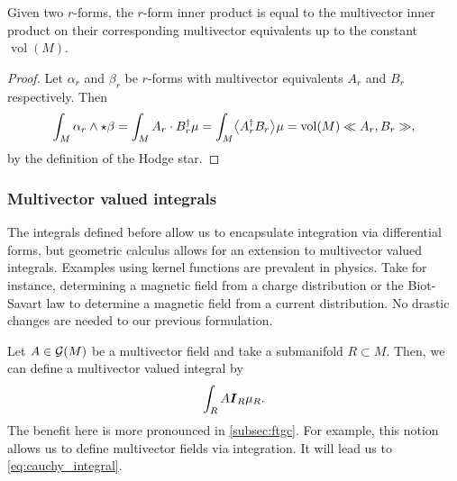 \begin{proposition}
Given two $r$-forms, the $r$-form inner product is equal to the multivector inner product on their corresponding multivector equivalents up to the constant $\operatorname{vol}(M)$.
\end{proposition}
\begin{proof}
Let $\alpha_r$ and $\beta_r$ be $r$-forms with multivector equivalents $A_r$ and $B_r$ respectively. Then
\begin{align*}
    \int_M \alpha_r \wedge \star \beta = \int_M A_r \cdot B_r^\dagger \mu = \int_M \proj{}{A_r^\dagger B_r} \mu =\operatorname{vol}(M) \multivecinnerproduct{A_r}{B_r},
\end{align*}
by the definition of the Hodge star.
\end{proof}


\subsubsection{Multivector valued integrals}

The integrals defined before allow us to encapsulate integration via differential forms, but geometric calculus allows for an extension to multivector valued integrals. Examples using kernel functions are prevalent in physics. Take for instance, determining a magnetic field from a charge distribution or the Biot-Savart law to determine a magnetic field from a current distribution. No drastic changes are needed to our previous formulation. 

Let $A\in \mathcal{G}(M)$ be a multivector field and take a submanifold $R\subset M$. Then, we can define a multivector valued integral by
\begin{equation}
\int_R A \boldsymbol{I}_R \mu_R.
\end{equation}
The benefit here is more pronounced in \cref{subsec:ftgc}. For example, this notion allows us to define multivector fields via integration. It will lead us to \cref{eq:cauchy_integral}.


